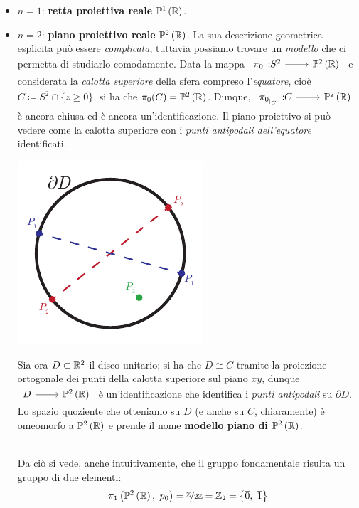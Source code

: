 	\begin{itemize}
		\item \underline{$n=1$}: \textbf{retta proiettiva reale} $\proj[1]{\realset}$.
		\item \underline{$n=2$}: \textbf{piano proiettivo reale} $\proj[2]{\realset}$. La sua descrizione geometrica esplicita può essere \textit{complicata}, tuttavia possiamo trovare un \textit{modello} che ci permetta di studiarlo comodamente. Data la mappa $\funz {\pi_0	} {S^2} {\proj[2]{\realset}}$ e considerata la \textit{calotta superiore} della sfera compreso l'\textit{equatore}, cioè $C\coloneqq S^2\cap\{z\geq 0\}$, si ha che $\pi_0(C)=\proj[2]{\realset}$. Dunque, $\funz {\pi_{0_{\mid_{C}}}} C {\proj[2]{\realset}}$ è ancora chiusa ed è ancora un'identificazione. Il piano proiettivo si può vedere come la calotta superiore con i \textit{punti antipodali dell'equatore} identificati.\\
\begin{minipage}{.23\linewidth}
	\includegraphics[trim=0cm 0cm 0cm 0cm,clip,scale=0.75]{images/projdisc.pdf}
\end{minipage}
\begin{minipage}{.76\linewidth}
	Sia ora $D\subset\mathbb{R}^2$ il disco unitario; si ha che $D\cong C$ tramite la proiezione ortogonale dei punti della calotta superiore sul piano $xy$, dunque $\funz{\ }{D}{\proj[2]{\realset}}$ è un'identificazione che identifica i \textit{punti antipodali} su $\partial{D}$. Lo spazio quoziente che otteniamo su $D$ (e anche su $C$, chiaramente) è omeomorfo a $\proj[2]{\realset}$ e prende il nome \textbf{modello piano di $\proj[2]{\realset}$}.
\end{minipage}\\
		Da ciò si vede, anche intuitivamente, che il gruppo fondamentale risulta un gruppo di due elementi:
		\begin{equation}
			\gruf{\proj[2]{\realset}}{p_0}=\nicefrac{\integerset}{2\integerset}=\integerset_2=\left\{\overline{0},\ \overline{1}\right\}

\end{equation}
\end{itemize}
